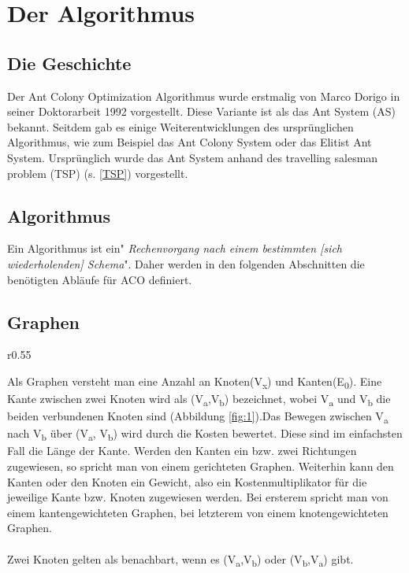 \documentclass[12pt]{article}
\begin{document}
\section{Der Algorithmus}
\subsection{Die Geschichte}\label{Geschichte}
Der Ant Colony Optimization Algorithmus wurde erstmalig von Marco Dorigo in seiner Doktorarbeit 1992 vorgestellt. Diese Variante ist als das Ant System (AS) bekannt. Seitdem gab es einige Weiterentwicklungen des ursprünglichen Algorithmus, wie zum Beispiel das Ant Colony System oder das Elitist Ant System.
Ursprünglich wurde das Ant System anhand des travelling salesman problem (TSP) (s. \ref{TSP}) vorgestellt.
\subsection{Algorithmus}
Ein Algorithmus ist ein"\textit{ Rechenvorgang nach einem bestimmten [sich wiederholenden] Schema}"\cite{duden_algo}. Daher werden in den folgenden Abschnitten die benötigten Abläufe für ACO definiert.
\subsection{Graphen}
\begin{wrapfigure}{r}{0.55\textwidth}
\centering
{}
\caption{Einfacher Graph}
\label{fig:1}
\end{wrapfigure}
Als Graphen versteht man eine Anzahl an Knoten(V\textsubscript{x}) und Kanten(E\textsubscript{0}). Eine Kante zwischen zwei Knoten wird als (V\textsubscript{a},V\textsubscript{b}) bezeichnet, wobei V\textsubscript{a} und V\textsubscript{b} die beiden verbundenen Knoten sind (Abbildung \ref{fig:1}).Das Bewegen zwischen V\textsubscript{a} nach V\textsubscript{b} über (V\textsubscript{a}, V\textsubscript{b}) wird durch die Kosten bewertet. Diese sind im einfachsten Fall die Länge der Kante. Werden den Kanten ein bzw. zwei Richtungen zugewiesen, so spricht man von einem gerichteten Graphen. Weiterhin kann den Kanten oder den Knoten ein Gewicht, also ein Kostenmultiplikator für die jeweilige Kante bzw. Knoten zugewiesen werden. Bei ersterem spricht man von einem kantengewichteten Graphen, bei letzterem von einem knotengewichteten Graphen.\\\\
Zwei Knoten gelten als benachbart, wenn es (V\textsubscript{a},V\textsubscript{b}) oder (V\textsubscript{b},V\textsubscript{a}) gibt.
\end{document}
